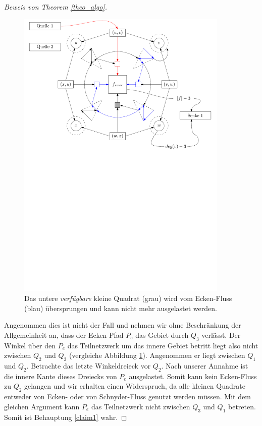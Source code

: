 \begin{proof}[Beweis von Theorem \ref{theo_algo}]
\begin{figure}
	\centering
  	\includegraphics[width=0.9\textwidth]{combined_face_skip.pdf}
  	\caption{Das untere \textit{verfügbare} kleine Quadrat (grau) wird vom Ecken-Fluss (blau) übersprungen und kann nicht mehr ausgelastet werden.}
	\label{combined_face_skip}
\end{figure}

Angenommen dies ist nicht der Fall und nehmen wir ohne Beschränkung der Allgemeinheit an, dass der Ecken-Pfad $P_e$ das Gebiet durch $Q_3$ verlässt. Der Winkel über den $P_e$ das Teilnetzwerk um das innere Gebiet betritt liegt also nicht zwischen $Q_2$ und $Q_3$ (vergleiche Abbildung \ref{combined_face_skip}). Angenommen er liegt zwischen $Q_1$ und $Q_2$. Betrachte das letzte Winkeldreieck vor $Q_2$. Nach unserer Annahme ist die innere Kante dieses Dreiecks von $P_e$ ausgelastet. Somit kann kein Ecken-Fluss zu $Q_2$ gelangen und wir erhalten einen Widerspruch, da alle kleinen Quadrate entweder von Ecken- oder von Schnyder-Fluss genutzt werden müssen. Mit dem gleichen Argument kann $P_e$ das Teilnetzwerk nicht zwischen $Q_3$ und $Q_1$ betreten. Somit ist Behauptung \ref{claim1} wahr.


\end{proof}
